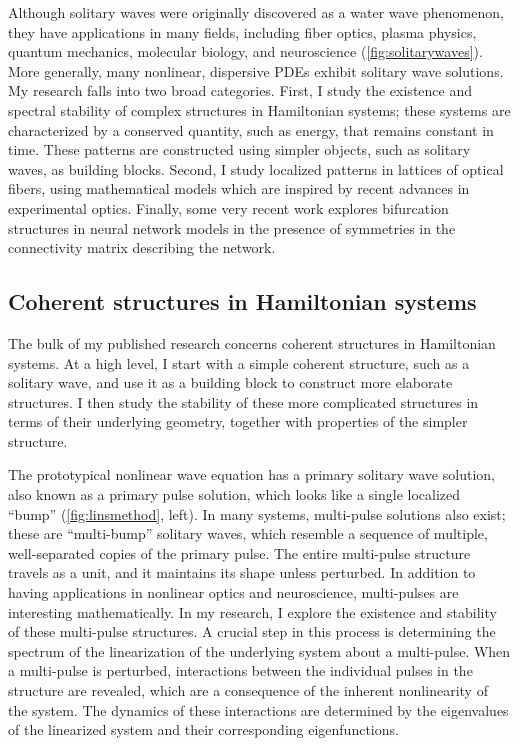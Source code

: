 \documentclass[11pt,reqno,oneside]{article}
\theoremstyle{definition}
\theoremstyle{remark}
\begin{document}
Although solitary waves were originally discovered as a water wave phenomenon, they have applications in many fields, including fiber optics, plasma physics, quantum mechanics, molecular biology, and neuroscience (\cref{fig:solitarywaves}). More generally, many nonlinear, dispersive PDEs exhibit solitary wave solutions. My research falls into two broad categories. First, I study the existence and spectral stability of complex structures in Hamiltonian systems; these systems are characterized by a conserved quantity, such as energy, that remains constant in time. These patterns are constructed using simpler objects, such as solitary waves, as building blocks. 
Second, I study localized patterns in lattices of optical fibers, using mathematical models which are inspired by recent advances in experimental optics. Finally, some very recent work explores bifurcation structures in neural network models in the presence of symmetries in the connectivity matrix describing the network.

\subsection*{Coherent structures in Hamiltonian systems}

The bulk of my published research concerns coherent structures in Hamiltonian systems. At a high level, I start with a simple coherent structure, such as a solitary wave, and use it as a building block to construct more elaborate structures. I then study the stability of these more complicated structures in terms of their underlying geometry, together with properties of the simpler structure. 

The prototypical nonlinear wave equation has a primary solitary wave solution, also known as a primary pulse solution, which looks like a single localized ``bump'' (\cref{fig:linsmethod}, left). In many systems, multi-pulse solutions also exist; these are ``multi-bump'' solitary waves, which resemble a sequence of multiple, well-separated copies of the primary pulse. The entire multi-pulse structure travels as a unit, and it maintains its shape unless perturbed. In addition to having applications in nonlinear optics and neuroscience, multi-pulses are interesting mathematically. In my research, I explore the existence and stability of these multi-pulse structures. A crucial step in this process is determining the spectrum of the linearization of the underlying system about a multi-pulse. When a multi-pulse is perturbed, interactions between the individual pulses in the structure are revealed, which are a consequence of the inherent nonlinearity of the system. The dynamics of these interactions are determined by the eigenvalues of the linearized system and their corresponding eigenfunctions.
\end{document}
